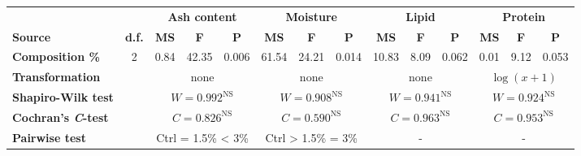 \begin{tabular}{l@{\hspace{1ex}}ccccccccccccc}
	\toprule
		 &  & \multicolumn{3}{c}{\textbf{Ash content}} & \multicolumn{3}{c}{\textbf{Moisture}} & \multicolumn{3}{c}{\textbf{Lipid}} & \multicolumn{3}{c}{\textbf{Protein}} \\[\spheader]
		\textbf{Source} & \textbf{d.f.} & \textbf{MS} & \textbf{F} & \textbf{P} & \textbf{MS} & \textbf{F} & \textbf{P} & \textbf{MS} & \textbf{F} & \textbf{P} & \textbf{MS} & \textbf{F} & \textbf{P} \\
	\midrule
		\textbf{Composition \%} & \num{2} & \num{0,84} & \num{42.35} & \num{0.006} & \num{61.54} & \num{24,21} & \num{0,014} & \num{10.83} & \num{8.09} & \num{0.062} & \num{0.01} & \num{9.12} & \num{0.053} \\[\spbtwrowsA]
		\textbf{Transformation} &  & \multicolumn{3}{c}{none} & \multicolumn{3}{c}{none}& \multicolumn{3}{c}{none}& \multicolumn{3}{c}{$ \log (x + 1) $} \\[\spbtwrowsA]
		\textbf{Shapiro-Wilk test} &  & \multicolumn{3}{c}{$ W = \num{0,992}^{\text{NS}} $} & \multicolumn{3}{c}{$ W = \num{0,908}^{\text{NS}} $} & \multicolumn{3}{c}{$ W = \num{0,941}^{\text{NS}} $} & \multicolumn{3}{c}{$ W = \num{0,924}^{\text{NS}} $} \\[\spbtwrowsA]
		\textbf{Cochran's \emph{C}-test} &  & \multicolumn{3}{c}{$ C = \num{0,826}^{\text{NS}} $} & \multicolumn{3}{c}{$ C = \num{0,590}^{\text{NS}} $} & \multicolumn{3}{c}{$ C = \num{0,963}^{\text{NS}} $} & \multicolumn{3}{c}{$ C = \num{0,953}^{\text{NS}} $} \\[\spbtwrowsA]
		\textbf{Pairwise test} &  & \multicolumn{3}{c}{Ctrl = \num{1.5}\% < 3\%} & \multicolumn{3}{c}{Ctrl > \num{1.5}\% = \num{3}\%}& \multicolumn{3}{c}{-}& \multicolumn{3}{c}{-} \\
	\bottomrule
\end{tabular}